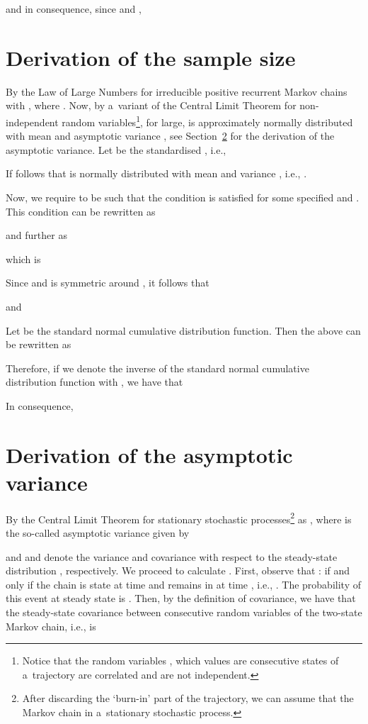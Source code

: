 \documentclass[runningheads,a4paper]{llncs}
\begin{document}
and in consequence, since  and ,


\section{Derivation of the sample size}
\label{app:n}
By the Law of Large Numbers for irreducible positive recurrent Markov chains
 with , where .
Now, by a~variant of the Central Limit Theorem for non-independent random
variables\footnote{Notice that the random variables ,  which values are consecutive
states of a~trajectory are correlated and are not independent.}, for  large, 
is approximately normally distributed with mean  and asymptotic
variance
, see
Section~\ref{app:as_var} for the derivation of the asymptotic variance. Let  be the
standardised , i.e.,

If follows that  is normally distributed with mean  and variance , i.e., .

Now, we require  to be such that the condition  is satisfied for some specified  and . This condition can be rewritten as

and further as

which is

Since  and  is symmetric around , it follows that

and

Let  be the standard normal cumulative distribution function. Then the above
can be rewritten as

Therefore, if we denote the inverse of the standard normal cumulative distribution function
with , we have that

In consequence,


\section{Derivation of the asymptotic variance}
\label{app:as_var}

By the Central Limit Theorem for stationary stochastic processes\footnote{After discarding the
`burn-in' part of the trajectory, we can assume that the Markov chain in a~stationary stochastic
process.}  as
, where  is the so-called asymptotic variance given by

and  and  denote the variance and covariance with respect to the
steady-state distribution , respectively. We proceed to calculate .
First, observe that :  if and only if the chain is state  at time  and remains in  at time
, i.e., . The probability of this event at steady state is
. Then, by the definition of covariance, we have that the
steady-state covariance between consecutive random variables of the two-state Markov chain, i.e.,  is
\end{document}
